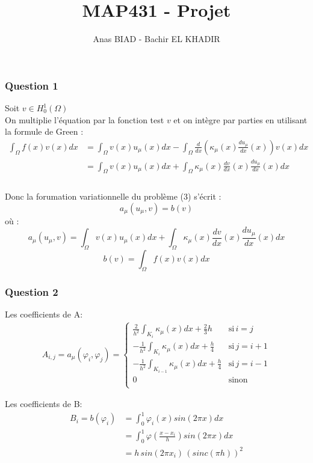 \documentclass{article}
\newcommand{\Deriv}[1]{\ensuremath{\frac{d}{dx}(#1)}}
\newcommand{\DDeriv}[1]{\ensuremath{\frac{d#1}{dx}}}
\newcommand{\Q}[1]{\subsubsection*{Question #1}}
\begin{document}
\title{MAP431 - Projet}
\author{Anas BIAD  - Bachir EL KHADIR }


\maketitle

\Q{1} 

Soit $ v \in H_{0}^{1}(\Omega) $ \\
On multiplie l'équation par la fonction test $v$ et on intègre par parties en utilisant la formule de Green : 
\begin{align*} 
 \int_{\Omega}  f(x)v(x)dx   &=  \int_{\Omega}  v(x)u_{\mu}(x)dx   -  \int_{\Omega}  \Deriv{ \kappa_{\mu}(x) \DDeriv{u_{\mu}}(x) } v(x)dx  \\
&= \int_{\Omega}  v(x)u_{\mu}(x)dx  +  \int_{\Omega}  \kappa_{\mu}(x) \DDeriv{v}(x) \DDeriv{u_{\mu}}(x) dx \\
\end{align*}
\\
Donc la forumation variationnelle du problème (3) s'écrit : 
$$a_{\mu}(u_{\mu},v) = b(v)$$ 
où : 
$$a_{\mu}(u_{\mu},v) = \int_{\Omega}  v(x)u_{\mu}(x)dx  +   \int_{\Omega}  \kappa_{\mu}(x) \DDeriv{v}(x) \DDeriv{u_{\mu}}(x) dx $$ 
$$b(v) =  \int_{\Omega}  f(x)v(x)dx $$

\Q{2}

Les coefficients de A:
\begin{align*}
A_{i,j} = a_{\mu}(\varphi_{i},\varphi_{j}) =
\left\{\begin{array}{ll}
\frac{2}{h^{2}} \int_{K_{i}} \kappa_{\mu}(x) dx + \frac{2}{3}h & \mbox{si} \, i = j \\
-\frac{1}{h^{2}} \int_{K_{i}} \kappa_{\mu}(x) dx + \frac{h}{4} & \mbox{si} \, j = i+1 \\
-\frac{1}{h^{2}} \int_{K_{i-1}} \kappa_{\mu}(x) dx + \frac{h}{4} & \mbox{si} \, j = i-1 \\
0 & \mbox{sinon} \\
\end{array}
\right.
\end{align*}

Les coefficients de B:
\begin{align*}
B_i = b(\varphi_{i}) &= \int_{0}^{1} \varphi_{i}(x) sin(2\pi x)dx  \\
&= \int_{0}^{1} \varphi(\frac{x-x_{i}}{h}) sin(2\pi x)dx \\
&= h \, sin(2 \pi x_{i}) \,  (sinc(\pi h))^{2}
\end{align*}
\end{document}
